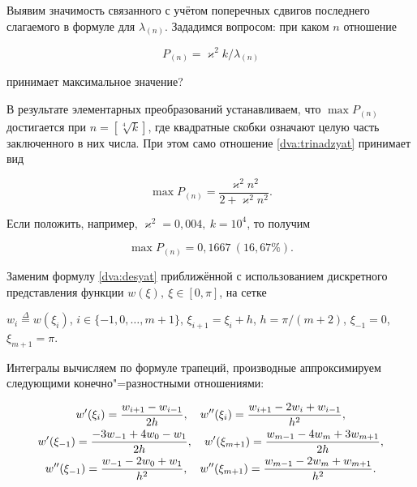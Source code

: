 Выявим значимость связанного с учётом поперечных сдвигов последнего слагаемого в формуле для $\lambda_{(n)}$. Зададимся вопросом: при каком $n$ отношение

\begin{equation}\label{dva:trinadzyat}

P_{(n)}={\varkappa^2k}/{\lambda_{(n)}}

\end{equation}

принимает максимальное значение?



\pagebreak



В результате элементарных преобразований устанавливаем, что $\max P_{(n)}$ достигается при $n=[\sqrt[4]{k}]$, где квадратные скобки означают целую часть заключенного в них числа. При этом само отношение \eqref{dva:trinadzyat} принимает вид

\begin{equation*}

\max P_{(n)}=\frac{\varkappa^2n^2}{2+\varkappa^2n^2}.

\end{equation*}

Если положить, например, $\varkappa^2=0,004,\ k=10^4$, то получим

\begin{equation*}

\max P_{(n)}=0,1667\ (16,67\%).

\end{equation*}



\smallskip




Заменим формулу \eqref{dva:desyat} приближённой с использованием дискретного представления функции $w(\xi),\ \xi\in[0,\pi]$, на сетке

$w_i\stackrel{\Delta}{=}w(\xi_i)$, $i\in\{-1, 0,\dots,m+1\}$, $\xi_{i+1}=\xi_i+h$, $h=\pi/(m+2)$, $\xi_{-1}=0$, $\xi_{m+1}=\pi$.

Интегралы вычисляем по формуле трапеций, производные аппроксимируем следующими конечно"=разностными отношениями:

\begin{gather}

w'(\xi_i)=\frac{w_{i+1}-w_{i-1}}{2h},\quad w''(\xi_i)=\frac{w_{i+1}-2w_i+w_{i-1}}{h^2},

\notag \\

\label{tri:odin}

w'(\xi_{-1})=\frac{-3w_{-1}+4w_{0}-w_1}{2h},\quad w'(\xi_{m+1})=\frac{w_{m-1}-4w_{m}+3w_{m+1}}{2h},\\

w''(\xi_{-1})=\frac{w_{-1}-2w_0+w_{1}}{h^2},\quad w''(\xi_{m+1})=\frac{w_{m-1}-2w_m+w_{m+1}}{h^2}.

\notag

\end{gather}

